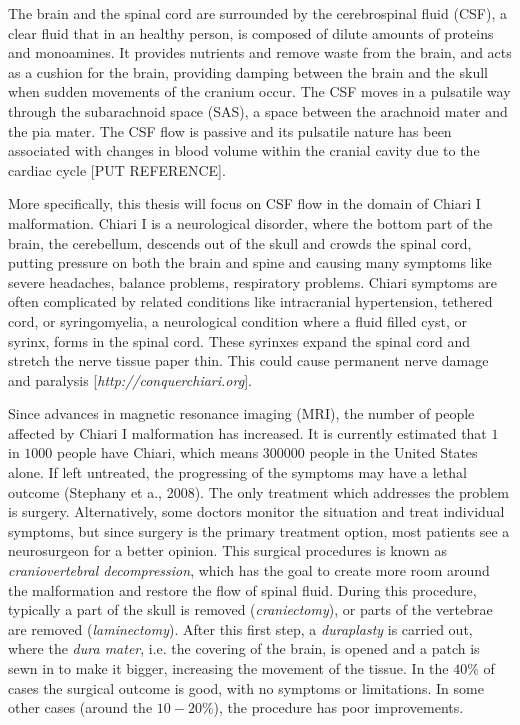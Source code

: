 \documentclass[a4paper,11pt,openright,twoside]{book}
\begin{document}
The brain and the spinal cord are surrounded by the cerebrospinal fluid (CSF), a clear fluid that in an healthy person, is composed of dilute amounts of proteins and monoamines. It provides nutrients and remove waste from the brain, and acts as a cushion for the brain, providing damping between the brain and the skull when sudden movements of the cranium occur. The CSF moves in a pulsatile way through the subarachnoid space (SAS), a space between the arachnoid mater and the pia mater. The CSF flow is passive and its pulsatile nature has been associated with changes in blood volume within the cranial cavity due to the cardiac cycle [PUT REFERENCE].

More specifically, this thesis will focus on CSF flow in the domain of Chiari I malformation. Chiari I is a neurological disorder, where the bottom part of the brain, the cerebellum, descends out of the skull and crowds the spinal cord, putting pressure on both the brain and spine and causing many symptoms like severe headaches, balance problems, respiratory problems. Chiari symptoms are often complicated by related conditions like intracranial hypertension, tethered cord, or syringomyelia, a neurological condition where a fluid filled cyst, or syrinx, forms in the spinal cord. These syrinxes expand the spinal cord and stretch the nerve tissue paper thin. This could cause permanent nerve damage and paralysis [\emph{http://conquerchiari.org}].

Since advances in magnetic resonance imaging (MRI), the number of people affected by Chiari I malformation has increased. It is currently estimated that $1$ in $1000$ people have Chiari, which means $300000$ people in the United States alone. If left untreated, the progressing of the symptoms may have a lethal outcome (Stephany et a., 2008). The only treatment which addresses the problem is surgery. Alternatively, some doctors monitor the situation and treat individual symptoms, but since surgery is the primary treatment option, most patients see a neurosurgeon for a better opinion. This surgical procedures is known as \textit{craniovertebral decompression}, which has the goal to create more room around the malformation and restore the flow of spinal fluid. During this procedure, typically a part of the skull is removed (\textit{craniectomy}), or parts of the vertebrae are removed (\textit{laminectomy}). After this first step, a \textit{duraplasty} is carried out, where the \textit{dura mater}, i.e. the covering of the brain, is opened and a patch is sewn in to make it bigger, increasing the movement of the tissue.
In the $40 \%$ of cases the surgical outcome is good, with no symptoms or limitations. In some other cases (around the $10-20 \%$), the procedure has poor improvements. 
\end{document}
